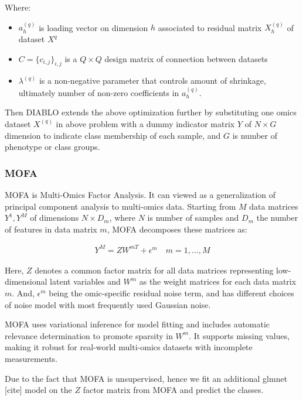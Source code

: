 \documentclass[
]{article}
\begin{document}
Where:

\begin{itemize}
\item
  \(a_h^{(q)}\) is loading vector on dimension \(h\) associated to residual matrix \(X_h^{(q)}\) of dataset \(X^{q}\)
\item
  \(C = \{c_{i,j}\}_{i,j}\) is a \(Q \times Q\) design matrix of connection between datasets
\item
  \(\lambda^{(q)}\) is a non-negative parameter that controls amount of shrinkage, ultimately number of non-zero coefficients in \(a_h^{(q)}\).
\end{itemize}

Then DIABLO extends the above optimization further by substituting one omics dataset \(X^{(q)}\) in above problem with a dummy indicator matrix \(Y\) of \(N \times G\) dimension to indicate class membership of each sample, and \(G\) is number of phenotype or class groups.

\hypertarget{mofa}{%
\subsubsection{MOFA}\label{mofa}}

MOFA is Multi-Omics Factor Analysis. It can viewed as a generalization of principal component analysis to multi-omics data. Starting from \(M\) data matrices \(Y^1, Y^M\) of dimensions \(N \times D_m\), where \(N\) is number of samples and \(D_m\) the number of features in data matrix \(m\), MOFA decomposes these matrices as:

\[
\begin{aligned}
Y^M = ZW^{mT} + \epsilon^m \quad m = 1, \dots, M
\end{aligned}
\]

Here, \(Z\) denotes a common factor matrix for all data matrices representing low-dimensional latent variables and \(W^m\) as the weight matrices for each data matrix \(m\). And, \(\epsilon^m\) being the omic-specific residual noise term, and has different choices of noise model with most frequently used Gaussian noise.

MOFA uses variational inference for model fitting and includes automatic relevance determination to promote sparsity in \(W^m\). It supports missing values, making it robust for real-world multi-omics datasets with incomplete measurements.

Due to the fact that MOFA is unsupervised, hence we fit an additional glmnet {[}cite{]} model on the \(Z\) factor matrix from MOFA and predict the classes.
\end{document}
